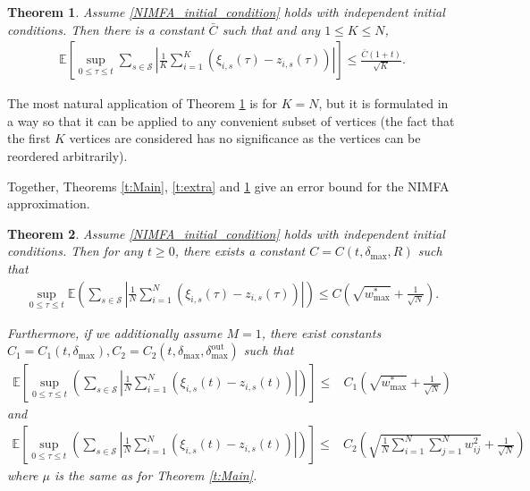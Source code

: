 \documentclass{article}
\newcommand{\E}{\mathbb{E}}
\newcommand{\1}[1]{{\mathds{1}}_{\left\{#1\right\}}}
\renewcommand{\S}{\mathcal{S}}
\newtheorem{theorem}{Theorem}
\newcommand{\remm}[1]{{#1}}
\begin{document}
 
 
	\begin{theorem}
		\label{t:fslln}
		Assume \eqref{NIMFA_initial_condition} holds with independent initial conditions. Then \remm{there is a constant $\bar{C}$ such that}  and any $1\leq K\leq N$, 
		\begin{align}
			\label{eq:fslln}
			\E \left[ \sup_{0 \leq \tau \leq  t} \sum_{s \in \S} \left|\frac1K\sum_{i=1}^K\left(\hat{\xi}_{i,s}(\tau)-z_{i,s}(\tau)\right) \right| \right] \leq  \frac{\remm{\bar{C}(1+t)}}{\sqrt{K}}.
		\end{align}	
	\end{theorem} 
	
	The most natural application of Theorem \ref{t:fslln} is for $K=N$, but it is formulated in a way so that it can be applied to any convenient subset of vertices (the fact that the first $K$ vertices are considered has no significance as the vertices can be reordered arbitrarily).
	
	Together, Theorems \ref{t:Main}, \ref{t:extra} and \ref{t:fslln} give an error bound for the NIMFA approximation.
	\begin{theorem}
		\label{t:xi_z}
		Assume \eqref{NIMFA_initial_condition} holds with independent initial conditions. Then for any $t \geq 0$, there exists a constant $C=C(t,\delta_{\max},R)$ such that
		\begin{align}
			\label{eq:thm4a}
			\sup_{0 \leq \tau \leq t} \E \left(\sum_{s \in \S} \left|\frac1N\sum_{i=1}^N\left(\xi_{i,s}(\tau)-z_{i,s}(\tau)\right) \right| \right)\leq
			C\left(\sqrt{\remm{w_{\max}^{*}}}+\frac{1}{\sqrt{N}}\right).
		\end{align}
		
		Furthermore, if we additionally assume $M=1$, there exist constants $C_1=C_1(t,\delta_{\max}), C_2=C_{2}(t,\delta_{\max},\delta_{\textrm{max}}^{\textrm{out}})$ such that
		\begin{align}
			\label{eq:thm4b}
			\E\left[\sup_{0 \leq \tau \leq t}  \left(\sum_{s \in \S} \left|\frac1N\sum_{i=1}^N\left(\xi_{i,s}(t)-z_{i,s}(t)\right) \right| \right)\right] \leq& C_1\left(\sqrt{\remm{w^{*}_{\max}}}+\frac{1}{\sqrt{N}} \right)
		\end{align}
		and
		\begin{align}
			\label{eq:thm4c}
			\E\left[\sup_{0 \leq \tau \leq t}  \left(\sum_{s \in \S} \left|\frac1N\sum_{i=1}^N\left(\xi_{i,s}(t)-z_{i,s}(t)\right) \right| \right)\right] \leq& C_2\left(\sqrt{\frac{1}{N}\sum_{i=1}^N \sum_{j=1}^N w_{ij}^2}+\frac{1}{\sqrt{N}} \right)
		\end{align}
		where $\mu$ is the same as for Theorem \ref{t:Main}.
	\end{theorem}
	
\end{document}
